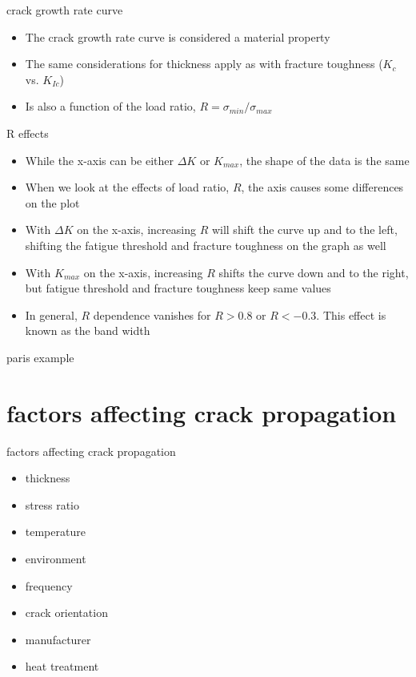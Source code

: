\documentclass[10pt]{beamer}
\begin{document}
\begin{frame}{crack growth rate curve}
	\begin{itemize}[<+->]
		\item The crack growth rate curve is considered a material property
		\item The same considerations for thickness apply as with fracture toughness ($K_c$ vs. $K_{Ic}$) 
		\item Is also a function of the load ratio, $R = \sigma_{min}/\sigma_{max}$
	\end{itemize}
\end{frame}

\begin{frame}{R effects}
	\begin{itemize}[<+->]
		\item While the x-axis can be either $\Delta K$ or $K_{max}$, the shape of the data is the same
		\item When we look at the effects of load ratio, $R$, the axis causes some differences on the plot
		\item With $\Delta K$ on the x-axis, increasing $R$ will shift the curve up and to the left, shifting the fatigue threshold and fracture toughness on the graph as well
		\item With $K_{max}$ on the x-axis, increasing $R$ shifts the curve down and to the right, but fatigue threshold and fracture toughness keep same values
		\item In general, $R$ dependence vanishes for $R> 0.8$ or $R<-0.3$. This effect is known as the band width
	\end{itemize}
\end{frame}

\begin{frame}{paris example}
	
\end{frame}

\section{factors affecting crack propagation}

\begin{frame}{factors affecting crack propagation}
	\begin{itemize}[<+->]
		\item thickness
		\item stress ratio
		\item temperature
		\item environment
		\item frequency
		\item crack orientation
		\item manufacturer
		\item heat treatment
	\end{itemize}
\end{frame}
\end{document}
